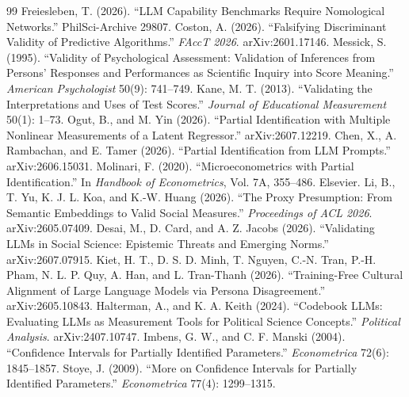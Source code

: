\documentclass[10pt,letterpaper]{article}
\begin{document}
\begin{thebibliography}{99}
 Freiesleben, T. (2026). ``LLM Capability Benchmarks Require Nomological Networks.'' PhilSci-Archive 29807. %
 Coston, A. (2026). ``Falsifying Discriminant Validity of Predictive Algorithms.'' \textit{FAccT 2026}. arXiv:2601.17146.
 Messick, S. (1995). ``Validity of Psychological Assessment: Validation of Inferences from Persons' Responses and Performances as Scientific Inquiry into Score Meaning.'' \textit{American Psychologist} 50(9): 741--749.
 Kane, M. T. (2013). ``Validating the Interpretations and Uses of Test Scores.'' \textit{Journal of Educational Measurement} 50(1): 1--73.
 Ogut, B., and M. Yin (2026). ``Partial Identification with Multiple Nonlinear Measurements of a Latent Regressor.'' arXiv:2607.12219.
 Chen, X., A. Rambachan, and E. Tamer (2026). ``Partial Identification from LLM Prompts.'' arXiv:2606.15031.
 Molinari, F. (2020). ``Microeconometrics with Partial Identification.'' In \textit{Handbook of Econometrics}, Vol. 7A, 355--486. Elsevier.
 Li, B., T. Yu, K. J. L. Koa, and K.-W. Huang (2026). ``The Proxy Presumption: From Semantic Embeddings to Valid Social Measures.'' \textit{Proceedings of ACL 2026}. arXiv:2605.07409.
 Desai, M., D. Card, and A. Z. Jacobs (2026). ``Validating LLMs in Social Science: Epistemic Threats and Emerging Norms.'' arXiv:2607.07915.
 Kiet, H. T., D. S. D. Minh, T. Nguyen, C.-N. Tran, P.-H. Pham, N. L. P. Quy, A. Han, and L. Tran-Thanh (2026). ``Training-Free Cultural Alignment of Large Language Models via Persona Disagreement.'' arXiv:2605.10843.
 Halterman, A., and K. A. Keith (2024). ``Codebook LLMs: Evaluating LLMs as Measurement Tools for Political Science Concepts.'' \textit{Political Analysis}. arXiv:2407.10747.
 Imbens, G. W., and C. F. Manski (2004). ``Confidence Intervals for Partially Identified Parameters.'' \textit{Econometrica} 72(6): 1845--1857.
 Stoye, J. (2009). ``More on Confidence Intervals for Partially Identified Parameters.'' \textit{Econometrica} 77(4): 1299--1315.
\end{thebibliography}
\end{document}
